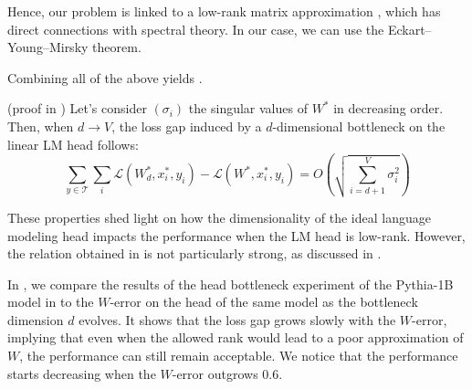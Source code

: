 Hence, our problem is linked to a low-rank matrix approximation \citep{low_rank}, which has direct connections with spectral theory. In our case, we can use the Eckart–Young–Mirsky theorem.


Combining all of the above yields .


\begin{theorem}{(proof in )}
\label{main_thm}
Let's consider $(\sigma_i)$ the singular values of $W^*$ in decreasing order. Then, when $d \rightarrow V$, the loss gap induced by a $d$-dimensional bottleneck on the linear LM head follows:
$$
\sum_{y \in \mathcal{T}} \sum_{i} \mathcal{L}(W_d^*, x^*_i, y_i) - \mathcal{L}(W^*, x^*_i, y_i) = O\left(\sqrt{\sum_{i=d+1}^{V}\sigma_i^2}\right)$$
\end{theorem}

These properties shed light on how the dimensionality of the ideal language modeling head impacts the performance when the LM head is low-rank. However, the relation obtained in  is not particularly strong, as discussed in .

In , we compare the results of the head bottleneck experiment of the Pythia-1B model in  to the $W$-error on the head of the same model as the bottleneck dimension $d$ evolves. It shows that the loss gap grows slowly with the $W$-error, implying that even when the allowed rank would lead to a poor approximation of $W$, the performance can still remain acceptable. We notice that the performance starts decreasing when the $W$-error outgrows 0.6.

